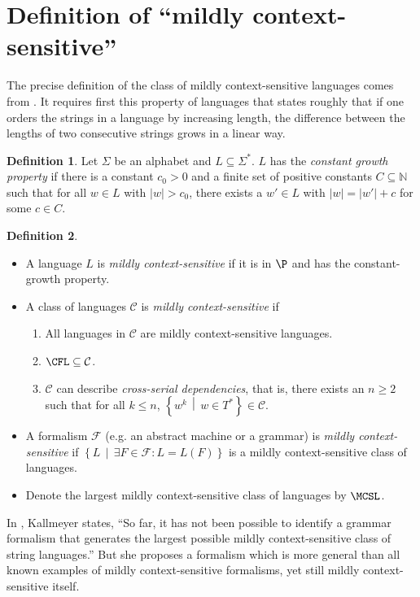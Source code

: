 \documentclass[draft]{article}
\theoremstyle{remark} \newtheorem{technicality}{Technical note}
\theoremstyle{definition} \newtheorem{definition}{Definition}
\theoremstyle{definition} \newtheorem{openproblem}{Open problem}
\newcommand{\lb}{\left\{} %
\newcommand{\rb}{\right\}} %
\newcommand{\st}{\,\middle|\,} %
\begin{document}



\appendix
\section{Definition of ``mildly context-sensitive''}
\label{app:definitions}

The precise definition of the class of mildly context-sensitive languages comes from \cite{kallmeyer}.
It requires first this property of languages that states roughly that if one orders the strings in a language by increasing length, the difference between the lengths of two consecutive strings grows in a linear way.
\begin{definition}
  Let $\Sigma$ be an alphabet and $L\subseteq\Sigma^*$.
  $L$ has the \emph{constant growth property} if there is a constant $c_0>0$ and a finite set of positive constants $C\subseteq\mathbb{N}$ such that for all $w\in L$ with $|w|>c_0$, there exists a $w'\in L$ with $|w|=|w'|+c$ for some $c\in C$.
\end{definition}
\begin{definition}\mbox{}
  \begin{itemize}
  \item A language $L$ is \emph{mildly context-sensitive} if it is in $\P$ and has the constant-growth property.
  \item A class of languages $\mathcal{C}$ is \emph{mildly context-sensitive} if
    \begin{enumerate}
    \item All languages in $\mathcal{C}$ are mildly context-sensitive languages.
    \item $\CFL\subseteq\mathcal{C}$.
    \item $\mathcal{C}$ can describe \emph{cross-serial dependencies}, that is, there exists an $n\geq 2$ such that for all $k\leq n$, $\lb w^k \st w\in T^*\rb\in\mathcal{C}$.
    \end{enumerate}
  \item A formalism $\mathcal{F}$ (e.g. an abstract machine or a grammar) is \emph{mildly context-sensitive} if $\lb L \st \exists F\in\mathcal{F}\colon L = L(F)\rb$ is a mildly context-sensitive class of languages.
  \item Denote the largest mildly context-sensitive class of languages by $\MCSL$.
  \end{itemize}
\end{definition}

In \cite{kallmeyer}, Kallmeyer states, ``So far, it has not been possible to identify a grammar formalism that generates the largest possible mildly context-sensitive class of string languages.''
But she proposes a formalism which is more general than all known examples of mildly context-sensitive formalisms, yet still mildly context-sensitive itself.
\end{document}
